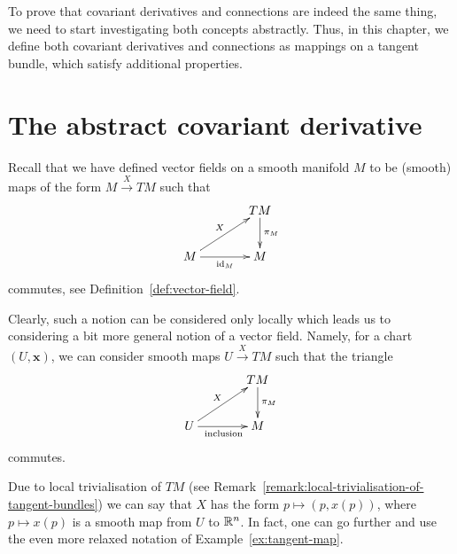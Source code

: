 \documentclass[11pt,a4paper,twoside,openany]{report}
\theoremstyle{my-theorem}
\theoremstyle{non-theorem}
\begin{document}
		To prove that covariant derivatives and connections are indeed the same thing, we need to start investigating both concepts abstractly. Thus, in this chapter, we define both covariant derivatives and connections as mappings on a tangent bundle, which satisfy additional properties.
		
		\section{The abstract covariant derivative}
		\label{sec:the-abstract-covariant-derivative}
		
			Recall that we have defined vector fields on a smooth manifold $M$ to be (smooth) maps of the form $M \xrightarrow{X} TM$ such that
			\begin{align*}
				\xymatrixcolsep{3pc}\xymatrix{
					& TM \ar[d]^-{\pi_M} \\
					M \ar[ru]^-X \ar[r]_{\id_M} & M}
			\end{align*}
			commutes, see Definition~\ref{def:vector-field}.
			
			Clearly, such a notion can be considered only locally which leads us to considering a bit more general notion of a vector field. Namely, for a chart $(U,\mathbf x)$, we can consider smooth maps $U \xrightarrow{X} TM$ such that the triangle
			\begin{align*}
				\xymatrixcolsep{3pc}\xymatrix{
					& TM \ar[d]^-{\pi_M} \\
					U \ar[ru]^-X \ar[r]_{\mathrm{inclusion}} & M}
			\end{align*}
			commutes.
			
			Due to local trivialisation of $TM$ (see Remark~\ref{remark:local-trivialisation-of-tangent-bundles}) we can say that $X$ has the form $p \mapsto (p,x(p))$, where $p \mapsto x(p)$ is a smooth map from $U$ to ${\mathbb R}^n$. In fact, one can go further and use the even more relaxed notation of Example~\ref{ex:tangent-map}.
			
\end{document}
